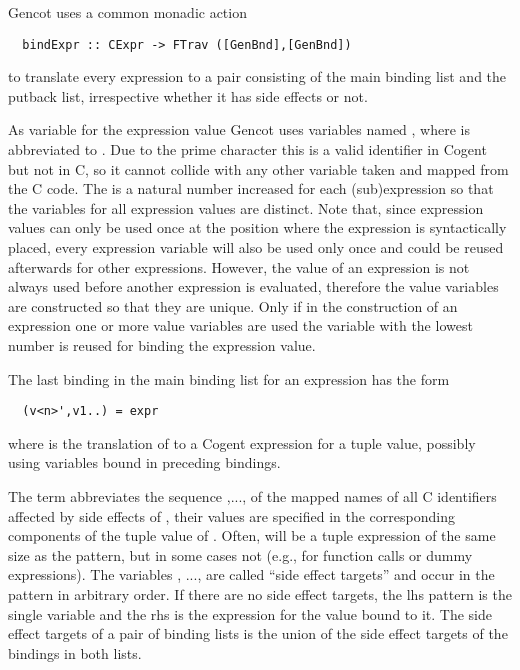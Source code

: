 Gencot uses a common monadic action 
\begin{verbatim}
  bindExpr :: CExpr -> FTrav ([GenBnd],[GenBnd])
\end{verbatim}
to translate every expression to a pair consisting of the main binding list and the putback list, irrespective whether 
it has side effects or not.

As variable for the expression value Gencot uses variables named , where  is abbreviated to 
. Due to the prime character this is
a valid identifier in Cogent but not in C, so it cannot collide with any other variable taken and mapped from the C
code. The  is a natural number increased for each (sub)expression so that the variables for all expression 
values are distinct. Note that, since expression values can only be used once at the position where the expression 
is syntactically placed, every expression variable will also be used only once and could be reused afterwards for 
other expressions. However, the value of an expression is not always used before another expression is evaluated,
therefore the value variables are constructed so that they are unique. Only if in the construction of an expression
one or more value variables are used the variable with the lowest number is reused for binding the expression value.

The last binding in the main binding list for an expression  has the form
\begin{verbatim}
  (v<n>',v1..) = expr
\end{verbatim}
where  is the translation of  to a Cogent expression for a tuple value, possibly using variables bound 
in preceding bindings. 

The term  abbreviates 
the sequence ,..., of the mapped names of all C identifiers affected by side effects of , their values 
are specified in the corresponding components of the tuple value of . Often,  will be a tuple 
expression of the same size as the pattern, but in some cases not (e.g., for function calls or dummy expressions). 
The variables , ...,  are called ``side effect targets'' and occur in the pattern in arbitrary order.
If there are no side effect targets, the lhs pattern is the single variable  and the rhs is the expression for
the value bound to it. The side effect targets of a 
pair of binding lists is the union of the side effect targets of the bindings in both lists.

